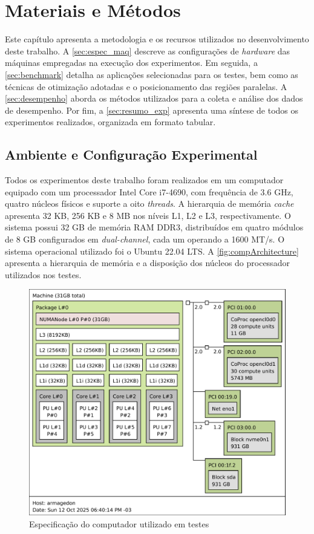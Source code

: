 \chapter{Materiais e Métodos}\label{cap:metodologia}

Este capítulo apresenta a metodologia e os recursos utilizados no desenvolvimento deste trabalho. A \autoref{sec:espec_maq} descreve as configurações de \textit{hardware} das máquinas empregadas na execução dos experimentos. Em seguida, a \autoref{sec:benchmark} detalha as aplicações selecionadas para os testes, bem como as técnicas de otimização adotadas e o posicionamento das regiões paralelas. A \autoref{sec:desempenho} aborda os métodos utilizados para a coleta e análise dos dados de desempenho. Por fim, a \autoref{sec:resumo_exp} apresenta uma síntese de todos os experimentos realizados, organizada em formato tabular.

\section{Ambiente e Configuração Experimental}\label{sec:config}

Todos os experimentos deste trabalho foram realizados em um computador equipado com um processador Intel Core i7-4690, com frequência de 3.6 GHz, quatro núcleos físicos e suporte a oito \textit{threads}. A hierarquia de memória \textit{cache} apresenta 32 KB, 256 KB e 8 MB nos níveis L1, L2 e L3, respectivamente. O sistema possui 32 GB de memória RAM DDR3, distribuídos em quatro módulos de 8 GB configurados em \textit{dual-channel}, cada um operando a 1600 MT/s. O sistema operacional utilizado foi o Ubuntu 22.04 LTS. A \autoref{fig:compArchitecture} apresenta a hierarquia de memória e a disposição dos núcleos do processador utilizados nos testes.

\begin{figure}[htb]
	\caption{Especificação do computador utilizado em testes}
	\label{fig:compArchitecture}
	\includegraphics[scale=0.7]{figuras/architecture.pdf}
	\fonte{}
\end{figure}

